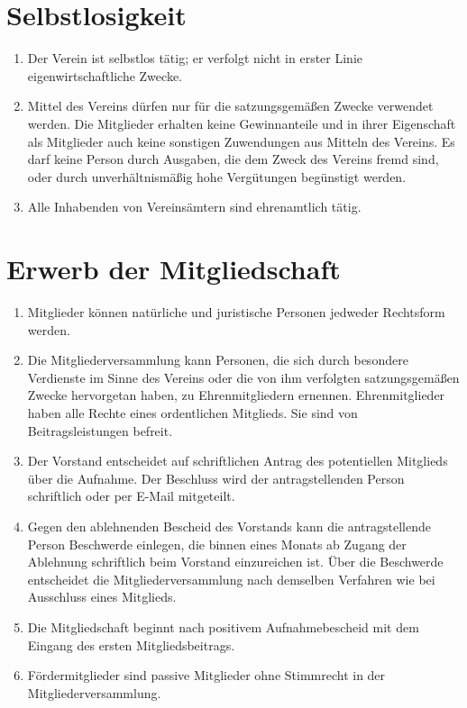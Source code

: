 \documentclass[a4paper, 12pt]{scrartcl}
\begin{document}
\section{Selbstlosigkeit}
\begin{enumerate}
	\item Der Verein ist selbstlos tätig; er verfolgt nicht in erster Linie eigenwirtschaftliche Zwecke.
	\item Mittel des Vereins dürfen nur für die satzungsgemäßen Zwecke verwendet werden. Die Mitglieder erhalten keine Gewinnanteile und in ihrer Eigenschaft als Mitglieder auch keine sonstigen Zuwendungen aus Mitteln des Vereins. Es darf keine Person durch Ausgaben, die dem Zweck des Vereins fremd sind, oder durch unverhältnismäßig hohe Vergütungen begünstigt werden.
	\item Alle Inhabenden von Vereinsämtern sind ehrenamtlich tätig.
\end{enumerate}

\section{Erwerb der Mitgliedschaft}
\label{erwerb-der-mitgliedschaft}
\begin{enumerate}
	\item Mitglieder können natürliche und juristische Personen jedweder Rechtsform werden.
	\item Die Mitgliederversammlung kann Personen, die sich durch besondere Verdienste im Sinne des Vereins oder die von ihm verfolgten satzungsgemäßen Zwecke hervorgetan haben, zu Ehrenmitgliedern ernennen. Ehrenmitglieder haben alle Rechte eines ordentlichen Mitglieds. Sie sind von Beitragsleistungen befreit.
	\item Der Vorstand entscheidet auf schriftlichen Antrag des potentiellen Mitglieds über die Aufnahme. Der Beschluss wird der antragstellenden Person schriftlich oder per E-Mail mitgeteilt.
	\item Gegen den ablehnenden Bescheid des Vorstands kann die antragstellende Person Beschwerde einlegen, die binnen eines Monats ab Zugang der Ablehnung schriftlich beim Vorstand einzureichen ist. Über die Beschwerde entscheidet die Mitgliederversammlung nach demselben Verfahren wie bei Ausschluss eines Mitglieds.
	\item \label{beginn-mitgliedschaft} Die Mitgliedschaft beginnt nach positivem Aufnahmebescheid mit dem Eingang des ersten Mitgliedsbeitrags.
	\item Fördermitglieder sind passive Mitglieder ohne Stimmrecht in der Mitgliederversammlung.
\end{enumerate}
\end{document}
